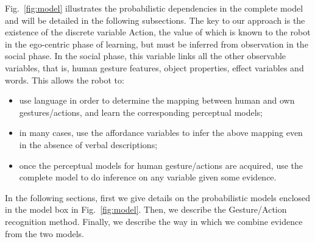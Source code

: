 Fig.~\ref{fig:model} illustrates the probabilistic dependencies in the complete model and will be detailed in the following subsections.
The key to our approach is the existence of the discrete variable Action, the value of which is known to the robot in the ego-centric phase of learning, but must be inferred from observation in the social phase.
In the social phase, this variable links all the other observable variables, that is, human gesture features, object properties, effect variables and words.
This allows the robot to:
\begin{itemize}
\item use language in order to determine the mapping between human and own gestures/actions, and learn the corresponding perceptual models;
\item in many cases, use the affordance variables to infer the above mapping even in the absence of verbal descriptions;
\item once the perceptual models for human gesture/actions are acquired, use the complete model to do inference on any variable given some evidence.
\end{itemize}
In the following sections, first we give details on the probabilistic models enclosed in the \AffWords{} model box in Fig.~\ref{fig:model}.
Then, we describe the Gesture/Action recognition method.
Finally, we describe the way in which we combine evidence from the two models.

